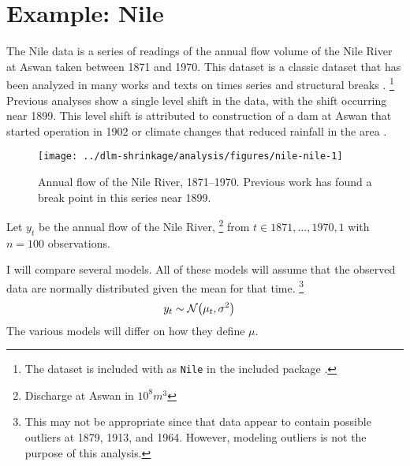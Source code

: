 \section{Example: Nile}
\label{dlm:sec:nile}

The Nile data is a series of readings of the annual flow volume of the Nile River at Aswan taken between 1871 and 1970.
This dataset is a classic dataset that has been analyzed in many works and texts on times series and structural breaks \parencites{Cobb1978}{Balke1993}{DeJongPenzer1998}{}{DurbinKoopman2012}{CommandeurKoopmanOoms2011}.%
\footnote{The dataset is included with \RLang{} as \texttt{Nile} in the included package .}
Previous analyses show a single level shift in the data, with the shift occurring near 1899.
This level shift is attributed to construction of a dam at Aswan that started operation in 1902 or climate changes that reduced rainfall in the area \parencite[278]{Cobb1978}.

\begin{figure}
  \centering
  \texttt{[image: ../dlm-shrinkage/analysis/figures/nile-nile-1]}
  \caption{Annual flow of the Nile River, 1871--1970. Previous work has found a break point in this series near 1899.}
  \label{dlm:fig:nile}
\end{figure}

Let $y_{t}$ be the annual flow of the Nile River,%
\footnote{Discharge at Aswan in $10^8 m^{3}$} %
from $t \in 1871, ..., 1970, 1$ with $n = 100$ observations.

I will compare several models.
All of these models will assume that the observed data are normally distributed given the mean for that time.%
\footnote{
  This may not be appropriate since that data appear to contain possible outliers at 1879, 1913, and 1964.
  However, modeling outliers is not the purpose of this analysis.
}
\begin{equation}
  \label{dlm:eq:10}
  \begin{aligned}[t]
    y_{t} &\sim \mathcal{N}\mathopen{}\left(\mu_{t}, \sigma^{2}\right)\mathclose{}
  \end{aligned}
\end{equation}
The various models will differ on how they define $\mu$.

